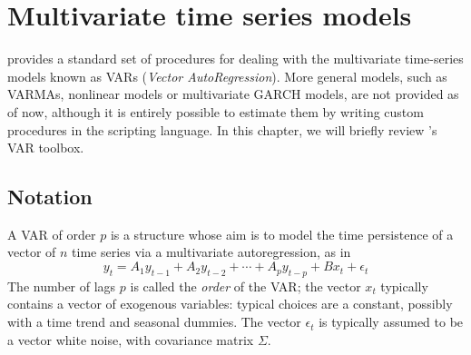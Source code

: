 \chapter{Multivariate time series models}
\label{chap:var}

 provides a standard set of procedures for dealing with the
multivariate time-series models known as VARs (\emph{Vector
  AutoRegression}). More general models, such as VARMAs, nonlinear
models or multivariate GARCH models, are not provided as of now,
although it is entirely possible to estimate them by writing custom
procedures in the  scripting language. In this chapter, we
will briefly review 's VAR toolbox.

\section{Notation}
\label{sec:var-def}

A VAR of order $p$ is a structure whose aim is to model the time
persistence of a vector of $n$ time series via a multivariate
autoregression, as in
\begin{equation}
  \label{eq:VAR}
  y_t = A_1 y_{t-1} + A_2 y_{t-2} + \cdots + A_p y_{t-p} +
  B x_t + \epsilon_t 
\end{equation}
The number of lags $p$ is called the \emph{order} of the VAR; the
vector $x_t$ typically contains a vector of exogenous variables:
typical choices are a constant, possibly with a time trend and
seasonal dummies. The vector $\epsilon_t$ is typically assumed to be a
vector white noise, with covariance matrix $\Sigma$.


